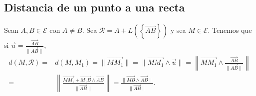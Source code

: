 \subsection*{Distancia de un punto a una recta}
Sean $\displaystyle A,B \in \mathcal{E} $ con $\displaystyle A \neq B $. Sea $\displaystyle \mathcal{R} = A + L\left( \left\{ \overrightarrow{AB}\right\} \right) $ y sea $\displaystyle M \in \mathcal{E} $. Tenemos que si $\displaystyle \vec{u} = \frac{\overrightarrow{AB}}{\|\overrightarrow{AB}\|} $, 
\[
\begin{split}
	d\left(M, \mathcal{R}\right) = & d\left(M, M_{1}\right) = \|\overrightarrow{MM_{1}}\| = \|\overrightarrow{MM_{1}}\land \vec{u}\| = \left\|\overrightarrow{MM_{1}}\land \frac{\overrightarrow{AB}}{\|\overrightarrow{AB}\|}\right\| \\
	= &  \left\|\frac{\overrightarrow{MM_{1}} + \overrightarrow{M_{1}B} \land \overrightarrow{AB}}{\|\overrightarrow{AB}\|}\right\| = \frac{\|\overrightarrow{MB}\land \overrightarrow{AB}\|}{\|\overrightarrow{AB}\|} .
\end{split}
\]
